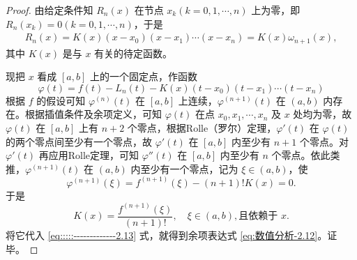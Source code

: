 \documentclass[../../main.tex]{subfiles}%
\begin{document}
\begin{proof}

由给定条件知 $R_n(x)$ 在节点 $x_k (k = 0, 1, \cdots, n)$ 上为零，即 $R_n(x_k) = 0 (k = 0, 1, \cdots, n)$，于是 
\begin{align}
R_n(x) = K(x)(x - x_0)(x - x_1) \cdots (x - x_n) = K(x) \omega_{n + 1}(x),\label{eq:::::-------------2.13}
\end{align}
其中 $K(x)$ 是与 $x$ 有关的待定函数。

现把 $x$ 看成 $[a, b]$ 上的一个固定点，作函数 
\[
\varphi(t) = f(t) - L_n(t) - K(x)(t - x_0)(t - x_1) \cdots (t - x_n)
\]
根据 $f$ 的假设可知 $\varphi^{(n)}(t)$ 在 $[a, b]$ 上连续，$\varphi^{(n + 1)}(t)$ 在 $(a, b)$ 内存在。根据插值条件及余项定义，可知 $\varphi(t)$ 在点 $x_0, x_1, \cdots, x_n$ 及 $x$ 处均为零，故 $\varphi(t)$ 在 $[a, b]$ 上有 $n + 2$ 个零点，根据Rolle（罗尔）定理，$\varphi'(t)$ 在 $\varphi(t)$ 的两个零点间至少有一个零点，故 $\varphi'(t)$ 在 $[a, b]$ 内至少有 $n + 1$ 个零点。对 $\varphi'(t)$ 再应用Rolle定理，可知 $\varphi''(t)$ 在 $[a, b]$ 内至少有 $n$ 个零点。依此类推，$\varphi^{(n + 1)}(t)$ 在 $(a, b)$ 内至少有一个零点，记为 $\xi \in (a, b)$，使 
\[
\varphi^{(n + 1)}(\xi) = f^{(n + 1)}(\xi) - (n + 1)! K(x) = 0.
\]
于是 
\[
K(x) = \frac{f^{(n + 1)}(\xi)}{(n + 1)!}, \quad \xi \in (a, b), \text{且依赖于 } x.
\]
将它代入 \eqref{eq:::::-------------2.13} 式，就得到余项表达式 \eqref{eq:数值分析-2.12}。证毕。

\end{proof}
\end{document}
